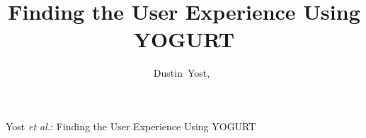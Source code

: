 \documentclass[journal]{IEEEtran}
\begin{document}
%
\title{Finding the User Experience Using YOGURT}
%
%
%

\author{
    Dustin~Yost,~
}

% 
%



%
{Yost \MakeLowercase{\textit{et al.}}: Finding the User Experience Using YOGURT}
% 
\end{document}
